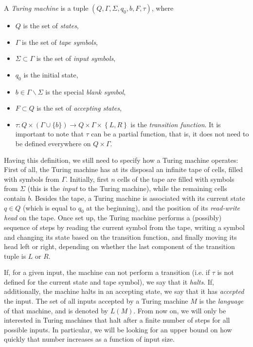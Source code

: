 \documentclass[12pt,a4paper,titlepage,openany]{report}
\begin{document}
\begin{definition}
	A \emph{Turing machine} is a tuple $ ( Q, \Gamma, \Sigma, q_0, b, F, \tau)$, where
	\begin{itemize}
		\item $Q$ is the set of \emph{states},
		\item $\Gamma$ is the set of \emph{tape symbols},
		\item $\Sigma \subset \Gamma$ is the set of \emph{input symbols}, 
		\item $q_0$ is the initial state,
		\item $b \in \Gamma \backslash \Sigma$ is the special \emph{blank symbol},
		\item $F \subset Q$ is the set of \emph{accepting states},
		\item $\tau: Q \times (\Gamma \cup \{b\}) \to Q \times \Gamma \times \left \{ L, R \right \}$ is the \emph{transition function}. It is important to note that $\tau$ can be a partial function, that is, it does not need to be defined everywhere on $Q \times \Gamma$.
	\end{itemize}
\end{definition}	

Having this definition, we still need to specify how a Turing machine operates: First of all, the Turing machine has at its disposal an infinite tape of cells, filled with symbols from $\Gamma$. Initially, first $n$ cells of the tape are filled with symbols from $\Sigma$ (this is the \emph{input} to the Turing machine), while the remaining cells contain $b$. Besides the tape, a Turing machine is associated with its current state $q \in Q$ (which is equal to $q_0$ at the beginning), and the position of its \emph{read-write head} on the tape. Once set up, the Turing machine performs a (possibly) sequence of steps by reading the current symbol from the tape, writing a symbol and changing its state based on the transition function, and finally moving its head left or right, depending on whether the last component of the transition tuple is $L$ or $R$. 

If, for a given input, the machine can not perform a transition (i.e. if $\tau$ is not defined for the current state and tape symbol), we say that it \emph{halts}. If, additionally, the machine halts in an accepting state, we say that it has \emph{accepted} the input.
The set of all inputs accepted by a Turing machine $M$ is the \emph{language} of that machine, and is denoted by $L(M)$. From now on, we will only be interested in Turing machines that halt after a finite number of steps for all possible inputs. In particular, we will be looking for an upper bound on how quickly that number increases as a function of input size.
\end{document}
